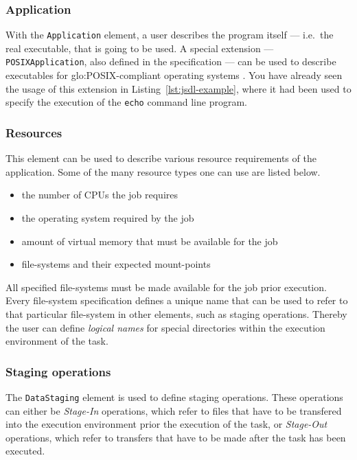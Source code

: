 \subsubsection{Application}

With the \texttt{Application} element, a user describes the program itself
---  i.e.~the  real executable,  that  is going  to  be  used.  A  special
extension --- \texttt{POSIXApplication}, also defined in the specification
\cite{jsdl-spec}   ---   can  be   used   to   describe  executables   for
\gls{glo:POSIX}-compliant   operating  systems  \cite{posix}.    You  have
already      seen     the     usage      of     this      extension     in
Listing~\ref{lst:jsdl-example},  where it  had  been used  to specify  the
execution of the \texttt{echo} command line program.

\subsubsection{Resources}

This element can be used  to describe various resource requirements of the
application. Some of the many resource types one can use are listed below.

\begin{itemize}
\item the number of CPUs the job requires
\item the operating system required by the job
\item amount of virtual memory that must be available for the job
\item file-systems  and their expected  mount-points
\end{itemize}

All  specified file-systems  must  be  made available  for  the job  prior
execution. Every file-system specification  defines a unique name that can
be used to refer to that particular file-system in other elements, such as
staging operations.  Thereby the  user can define \emph{logical names} for
special directories within the execution environment of the task.
  
\subsubsection{Staging operations}

The   \texttt{DataStaging}    element   is   used    to   define   staging
operations.  These operations  can either  be  \emph{Stage-In} operations,
which  refer  to files  that  have to  be  transfered  into the  execution
environment  prior   the  execution  of  the   task,  or  \emph{Stage-Out}
operations, which refer  to transfers that have to be  made after the task
has been executed.

